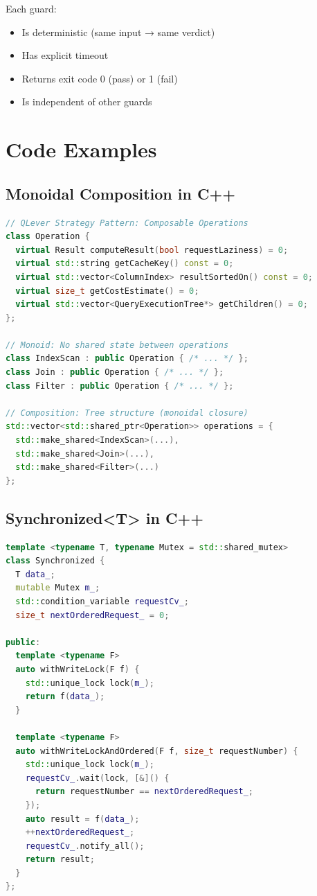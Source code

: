 \documentclass[12pt,oneside,a4paper]{book}
\theoremstyle{definition}
\begin{document}
Each guard:
\begin{itemize}
  \item Is deterministic (same input → same verdict)
  \item Has explicit timeout
  \item Returns exit code 0 (pass) or 1 (fail)
  \item Is independent of other guards
\end{itemize}

\chapter{Code Examples}
\label{app:code}

\section{Monoidal Composition in C++}
\label{app:code-monoidal}

\begin{lstlisting}[language=C++]
// QLever Strategy Pattern: Composable Operations
class Operation {
  virtual Result computeResult(bool requestLaziness) = 0;
  virtual std::string getCacheKey() const = 0;
  virtual std::vector<ColumnIndex> resultSortedOn() const = 0;
  virtual size_t getCostEstimate() = 0;
  virtual std::vector<QueryExecutionTree*> getChildren() = 0;
};

// Monoid: No shared state between operations
class IndexScan : public Operation { /* ... */ };
class Join : public Operation { /* ... */ };
class Filter : public Operation { /* ... */ };

// Composition: Tree structure (monoidal closure)
std::vector<std::shared_ptr<Operation>> operations = {
  std::make_shared<IndexScan>(...),
  std::make_shared<Join>(...),
  std::make_shared<Filter>(...)
};
\end{lstlisting}

\section{Synchronized<T> in C++}
\label{app:code-synchronized}

\begin{lstlisting}[language=C++]
template <typename T, typename Mutex = std::shared_mutex>
class Synchronized {
  T data_;
  mutable Mutex m_;
  std::condition_variable requestCv_;
  size_t nextOrderedRequest_ = 0;

public:
  template <typename F>
  auto withWriteLock(F f) {
    std::unique_lock lock(m_);
    return f(data_);
  }

  template <typename F>
  auto withWriteLockAndOrdered(F f, size_t requestNumber) {
    std::unique_lock lock(m_);
    requestCv_.wait(lock, [&]() {
      return requestNumber == nextOrderedRequest_;
    });
    auto result = f(data_);
    ++nextOrderedRequest_;
    requestCv_.notify_all();
    return result;
  }
};
\end{lstlisting}
\end{document}
